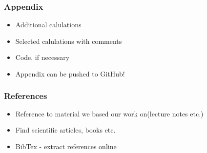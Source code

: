 \documentclass[12pt]{article}
\begin{document}
\subsubsection*{Appendix}

\begin{itemize}
\item Additional calulations
\item Selected calulations with comments
\item Code, if necessary
\item Appendix can be pushed to GitHub!
\end{itemize}

\subsubsection*{References}

\begin{itemize}
\item Reference to material we based our work on(lecture notes etc.)
\item Find scientific articles, books etc.
\item BibTex - extract references online
\end{itemize}
\end{document}
